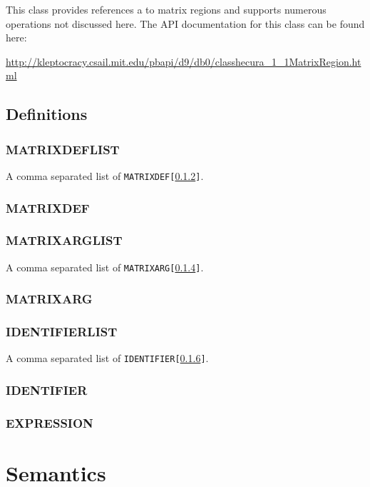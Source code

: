 \documentclass[11pt]{article}
\begin{document}
This class provides references a to matrix regions and supports numerous operations
not discussed here.  The API documentation for this class can be found here:

\noindent
\url{http://kleptocracy.csail.mit.edu/pbapi/d9/db0/classhecura_1_1MatrixRegion.html}


\subsection{Definitions}
\subsubsection{MATRIXDEFLIST}
\label{MATRIXDEFLIST}
 
A comma separated list of {\tt MATRIXDEF[\ref{MATRIXDEF}]}.

\subsubsection{MATRIXDEF}
\label{MATRIXDEF}

\subsubsection{MATRIXARGLIST}
\label{MATRIXARGLIST}

A comma separated list of {\tt MATRIXARG[\ref{MATRIXARG}]}.

\subsubsection{MATRIXARG}
\label{MATRIXARG}

\subsubsection{IDENTIFIERLIST}
\label{IDENTIFIERLIST}

A comma separated list of {\tt IDENTIFIER[\ref{IDENTIFIER}]}.

\subsubsection{IDENTIFIER}
\label{IDENTIFIER}

\subsubsection{EXPRESSION}
\label{EXPRESSION}

\section{Semantics}
\end{document}
